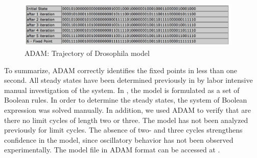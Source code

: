 \documentclass[11pt]{amsart}
\begin{document}
\begin{figure}[htb]
\centering
\includegraphics[width=0.95\textwidth]{DroTraj.jpg}
\caption{ADAM: Trajectory of Drosophila model}
\label{fig:traj}
\end{figure}
To summarize, ADAM correctly identifies the fixed points
in less than one second. All steady states have been determined previously in \cite{AO} by labor intensive manual investigation of the system. In \cite{AO}, the model is formulated as a set of Boolean rules. In order to determine the steady states, the system of Boolean expression was solved manually.
In addition, we used ADAM to verify that are there no limit
cycles of length two or three. The model has not been analyzed previously for
limit cycles. The absence of two- and three cycles strengthens confidence in
the model, since oscillatory behavior has not been observed experimentally.
The model file in ADAM format can be accessed at \cite{DrosophilaModel}.
\end{document}
